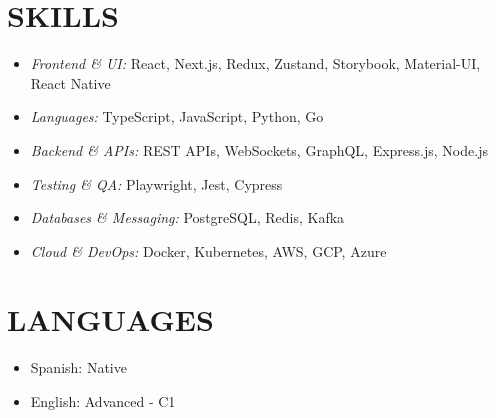 \documentclass{article}
\begin{document}
\section*{SKILLS}
\begin{itemize}
	\item \textit{Frontend \& UI:} React, Next.js, Redux, Zustand, Storybook, Material-UI, React Native
	\item \textit{Languages:} TypeScript, JavaScript, Python, Go
	\item \textit{Backend \& APIs:} REST APIs, WebSockets, GraphQL, Express.js, Node.js
	\item \textit{Testing \& QA:} Playwright, Jest, Cypress
	\item \textit{Databases \& Messaging:} PostgreSQL, Redis, Kafka
	\item \textit{Cloud \& DevOps:} Docker, Kubernetes, AWS, GCP, Azure
\end{itemize}

\section*{LANGUAGES}
\begin{itemize}[left=0pt]
	\item Spanish: Native
	\item English: Advanced {-} C1
\end{itemize}
\end{document}
